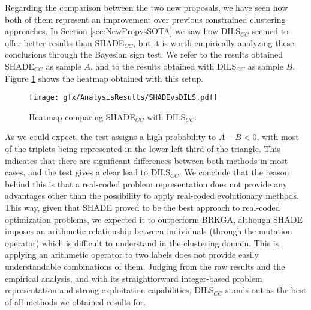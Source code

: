 Regarding the comparison between the two new proposals, we have seen how both of them represent an improvement over previous constrained clustering approaches. In Section \ref{sec:NewPropvsSOTA} we saw how \acs{DILS}$_{CC}$ seemed to offer better results than \acs{SHADE}$_{CC}$, but it is worth empirically analyzing these conclusions through the Bayesian sign test. We refer to the results obtained \acs{SHADE}$_{CC}$ as sample $A$, and to the results obtained with \acs{DILS}$_{CC}$ as sample $B$. Figure \ref{fig:SHADEvsDILS} shows the heatmap obtained with this setup.

\begin{figure}[!h]
	\centering
	\texttt{[image: gfx/AnalysisResults/SHADEvsDILS.pdf]}
	\caption{Heatmap comparing \acs{SHADE}$_{CC}$ with \acs{DILS}$_{CC}$.}\label{fig:SHADEvsDILS}
\end{figure}

As we could expect, the test assigns a high probability to $A - B < 0$, with most of the triplets being represented in the lower-left third of the triangle. This indicates that there are significant differences between both methods in most cases, and the test gives a clear lead to \acs{DILS}$_{CC}$. We conclude that the reason behind this is that a real-coded problem representation does not provide any advantages other  than the possibility to apply real-coded evolutionary methods. This way, given that \acs{SHADE} proved to be the best approach to real-coded optimization problems, we expected it to outperform \acs{BRKGA}, although \acs{SHADE} imposes an arithmetic relationship between individuals (through the mutation operator) which is difficult to understand in the clustering domain. This is, applying an arithmetic operator to two labels does not provide easily understandable combinations of them. Judging from the raw results and the empirical analysis, and with its straightforward integer-based problem representation and strong exploitation capabilities, \acs{DILS}$_{CC}$ stands out as the best of all methods we obtained results for.









